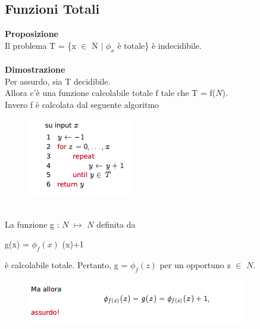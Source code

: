 \subsection{Funzioni Totali}
\textbf{Proposizione}\\
Il problema T = \{x $\in$ N $|$ $\phi_x$ è totale\} è indecidibile.\\\\
\textbf{Dimostrazione}\\
Per assurdo, sia T decidibile.\\
Allora c’è una funzione calcolabile totale f tale che T = f($N$).\\
Invero f è calcolata dal seguente algoritmo\\
\begin{figure}[htp]
    \includegraphics[scale=1]{tesi_stile/img/algo.png}
\end{figure}\\
La funzione g : $N$ $\mapsto$ $N$ definita da
\begin{center}
    g(x) = $\phi_f(x)$ (x)$+$1
\end{center}
è calcolabile totale. Pertanto, g = $\phi_f(z)$ per un opportuno z $\in$ $N$.\\
\begin{figure}[htp]
    \includegraphics[scale=1]{tesi_stile/img/assurdo.png}
\end{figure}
\newpage
